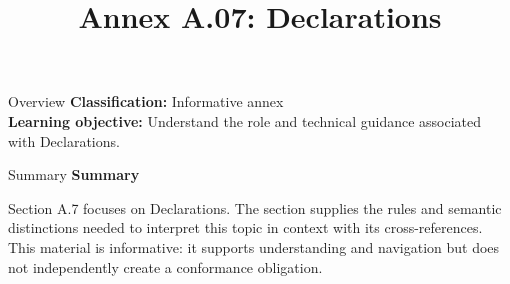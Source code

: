 \documentclass[10pt,letterpaper]{article}
\title{Annex A.07: Declarations}
\author{}
\date{}
\begin{document}
\maketitle
\begin{CornellOverviewBox}{Overview}
\textbf{Classification:} Informative annex\\[2pt]
\textbf{Learning objective:} Understand the role and technical guidance associated with Declarations.
\end{CornellOverviewBox}\begin{CornellSummaryBox}{Summary}
{\sffamily\bfseries\color{Accent} Summary}\par\vspace{3pt}Section A.7 focuses on Declarations. The section supplies the rules and semantic distinctions needed to interpret this topic in context with its cross-references. This material is informative: it supports understanding and navigation but does not independently create a conformance obligation.
\end{CornellSummaryBox}
\end{document}
